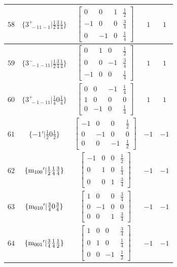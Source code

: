 \documentclass[fleqn,8pt]{jsarticle}
\begin{document}
\begin{longtable}{ccccc}
$ 58 $ & $ \{3^{+}_{\,\,-11-1}|\frac{1}{2} \frac{3}{4} \frac{1}{4}\} $ & $ \begin{bmatrix} 0 & 0 & 1 & \frac{1}{2} \\ -1 & 0 & 0 & \frac{3}{4} \\ 0 & -1 & 0 & \frac{1}{4} \end{bmatrix} $ & $ 1 $ & $ 1 $ \\ \hline
$ 59 $ & $ \{3^{-}_{\,\,-1-11}|\frac{1}{2} \frac{3}{4} \frac{1}{4}\} $ & $ \begin{bmatrix} 0 & 1 & 0 & \frac{1}{2} \\ 0 & 0 & -1 & \frac{3}{4} \\ -1 & 0 & 0 & \frac{1}{4} \end{bmatrix} $ & $ 1 $ & $ 1 $ \\ \hline
$ 60 $ & $ \{3^{+}_{\,\,-1-11}|\frac{1}{4} 0 \frac{1}{4}\} $ & $ \begin{bmatrix} 0 & 0 & -1 & \frac{1}{4} \\ 1 & 0 & 0 & 0 \\ 0 & -1 & 0 & \frac{1}{4} \end{bmatrix} $ & $ 1 $ & $ 1 $ \\ \hline
$ 61 $ & $ \{-1{}'|\frac{1}{2} 0 \frac{1}{2}\} $ & $ \begin{bmatrix} -1 & 0 & 0 & \frac{1}{2} \\ 0 & -1 & 0 & 0 \\ 0 & 0 & -1 & \frac{1}{2} \end{bmatrix} $ & $ -1 $ & $ -1 $ \\ \hline
$ 62 $ & $ \{{\rm m}_{100}{}'|\frac{1}{2} \frac{1}{4} \frac{3}{4}\} $ & $ \begin{bmatrix} -1 & 0 & 0 & \frac{1}{2} \\ 0 & 1 & 0 & \frac{1}{4} \\ 0 & 0 & 1 & \frac{3}{4} \end{bmatrix} $ & $ -1 $ & $ -1 $ \\ \hline
$ 63 $ & $ \{{\rm m}_{010}{}'|\frac{3}{4} 0 \frac{3}{4}\} $ & $ \begin{bmatrix} 1 & 0 & 0 & \frac{3}{4} \\ 0 & -1 & 0 & 0 \\ 0 & 0 & 1 & \frac{3}{4} \end{bmatrix} $ & $ -1 $ & $ -1 $ \\ \hline
$ 64 $ & $ \{{\rm m}_{001}{}'|\frac{3}{4} \frac{1}{4} \frac{1}{2}\} $ & $ \begin{bmatrix} 1 & 0 & 0 & \frac{3}{4} \\ 0 & 1 & 0 & \frac{1}{4} \\ 0 & 0 & -1 & \frac{1}{2} \end{bmatrix} $ & $ -1 $ & $ -1 $ \\ \hline

\end{longtable}
\end{document}
